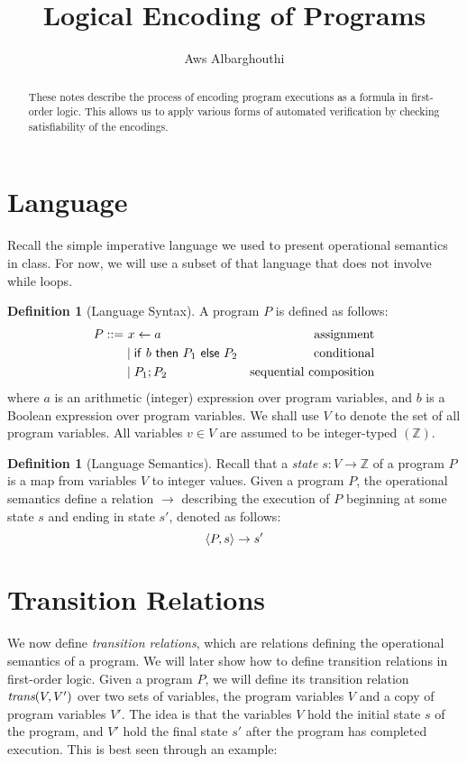 \documentclass{amsart}
\theoremstyle{definition}
\newtheorem{definition}[theorem]{Definition}
\theoremstyle{remark}
\numberwithin{equation}{section}
\begin{document}
\title{Logical Encoding of Programs}

\author{Aws Albarghouthi}
\address{University of Wisconsin--Madison}

\maketitle

\begin{abstract}
These notes describe the process
of encoding program executions as a formula
in first-order logic.
This allows us to apply various forms of
automated verification by checking satisfiability
of the encodings.
\end{abstract}

\section{Language}
Recall the simple imperative language we used
to present operational semantics in class.
For now, we will use a subset of that language
that does not involve while loops.

\begin{definition}[Language Syntax]
  A program $P$ is defined as follows:
  \begin{align*}
    P ::= &~ x \gets a & \text{assignment}\\
    & \mid \mathsf{if}~ b ~ \mathsf{then}~ P_1 ~\mathsf{else}~ P_2 & \text{conditional}\\
    & \mid P_1; P_2 & \text{sequential composition}
  \end{align*}
  where $a$ is an arithmetic (integer) expression over program variables,
  and $b$ is a Boolean expression over program variables.
  We shall use $V$ to denote the set of all program variables.
  All variables $v \in V$ are assumed to be integer-typed $(\mathbb{Z})$.
\end{definition}

\begin{definition}[Language Semantics]
Recall that a \emph{state} $s: V \to \mathbb{Z}$
of a program $P$ is a map from variables $V$ to integer values.
Given a program $P$, the operational semantics
define a relation $\to$ describing the execution of $P$ beginning at some state $s$ and ending in state $s'$, denoted as follows:
$$ \langle P,s \rangle \to s' $$
\end{definition}

\section{Transition Relations}
We now define \emph{transition relations},
which are relations defining the operational semantics
of a program. We will later show how to define
transition relations in first-order logic.
Given a program $P$, we will define its transition
relation $\emph{trans}(V,V')$ over two sets of variables,
the program variables $V$ and a copy of program variables
$V'$. The idea is that the variables $V$ hold the initial
state $s$ of the program, and $V'$ hold the final state $s'$
after the program has completed execution.
This is best seen through an example:
\end{document}
